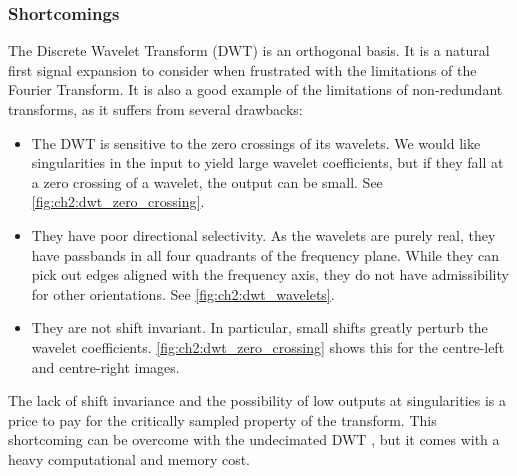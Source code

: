   \subsubsection{Shortcomings}
  The Discrete Wavelet Transform (DWT) is an orthogonal basis. It is a natural
  first signal expansion to consider when frustrated with the limitations of the
  Fourier Transform. It is also a good example of the limitations of
  non-redundant transforms, as it suffers from several drawbacks:
  \begin{itemize}
    \item The DWT is sensitive to the zero crossings of its wavelets. We would
      like singularities in the input to yield large wavelet coefficients, but
      if they fall at a zero crossing of a wavelet, the output can be small. See
      \autoref{fig:ch2:dwt_zero_crossing}.
    \item They have poor directional selectivity. As the wavelets are purely
      real, they have passbands in all four quadrants of the frequency plane.
      While they can pick out edges aligned with the frequency axis, they do
      not have admissibility for other orientations. See
      \autoref{fig:ch2:dwt_wavelets}.
    \item They are not shift invariant. In particular, small shifts greatly
      perturb the wavelet coefficients. \autoref{fig:ch2:dwt_zero_crossing} shows
      this for the centre-left and centre-right images.
  \end{itemize}

  The lack of shift invariance and the possibility of low outputs at
  singularities is a price to pay for the critically sampled property of the
  transform. This shortcoming can be overcome with the undecimated DWT
  \cite{mallat_wavelet_1998,coifman_translation-invariant_1995}, 
  but it comes with a heavy computational and memory cost.

